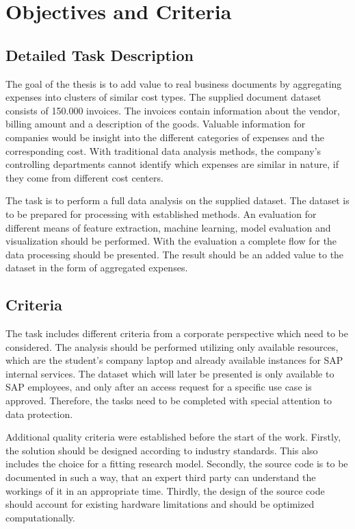 \chapter{Objectives and Criteria}
\section{Detailed Task Description}
The goal of the thesis is to add value to real business documents by aggregating expenses into clusters of similar cost types. The supplied document dataset consists of 150.000 invoices. The invoices contain information about the vendor, billing amount and a description of the goods. Valuable information for companies would be insight into the different categories of expenses and the corresponding cost. With traditional data analysis methods, the company’s controlling departments cannot identify which expenses are similar in nature, if they come from different cost centers. 

The task is to perform a full data analysis on the supplied dataset. The dataset is to be prepared for processing with established methods. An evaluation for different means of feature extraction, machine learning, model evaluation and visualization should be performed. With the evaluation a complete flow for the data processing should be presented. The result should be an added value to the dataset in the form of aggregated expenses.

\section{Criteria}

The task includes different criteria from a corporate perspective which need to be considered. The analysis should be performed utilizing only available resources, which are the student’s company laptop and already available instances for SAP internal services. The dataset which will later be presented is only available to SAP employees, and only after an access request for a specific use case is approved. Therefore, the tasks need to be completed with special attention to data protection. 

Additional quality criteria were established before the start of the work. Firstly, the solution should be designed according to industry standards. This also includes the choice for a fitting research model. Secondly, the source code is to be documented in such a way, that an expert third party can understand the workings of it in an appropriate time. Thirdly, the design of the source code should account for existing hardware limitations and should be optimized computationally.

